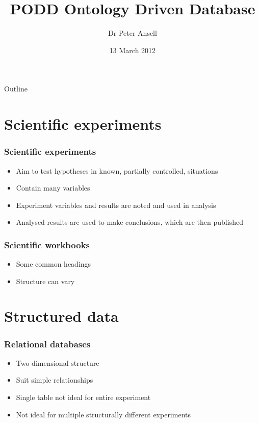\documentclass[12pt]{beamer}
\title{PODD Ontology Driven Database}
\author{Dr Peter Ansell}
\institute{University of Queensland}
\date{13 March 2012}
\begin{document}
\begin{frame}
\titlepage
\end{frame}

\begin{frame}{Outline}
  \tableofcontents
\end{frame}

\section{Scientific experiments}

\begin{frame}
\frametitle{Scientific experiments}

\begin{itemize}
 \item Aim to test hypotheses in known, partially controlled, situations
\pause
 \item Contain many variables
\pause
 \item Experiment variables and results are noted and used in analysis
\pause
 \item Analysed results are used to make conclusions, which are then published
\end{itemize}
\end{frame}

\begin{frame}
\frametitle{Scientific workbooks}

\begin{itemize}
 \item Some common headings
\pause
 \item Structure can vary
\end{itemize}
\end{frame}

\section{Structured data}

\begin{frame}
\frametitle{Relational databases}

\begin{itemize}
 \item Two dimensional structure
\pause
 \item Suit simple relationships
\pause
 \item Single table not ideal for entire experiment
\pause
 \item Not ideal for multiple structurally different experiments
\end{itemize}
\end{frame}
\end{document}
